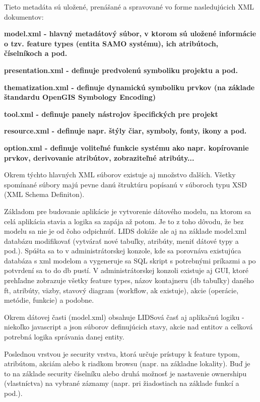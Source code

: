 Tieto metadáta sú uložené, prenášané a spravované vo forme nasledujúcich XML dokumentov:

\startitemize
\item{\start \bf model.xml \stop - hlavný metadátový súbor, v ktorom sú uložené informácie o tzv. feature types (entita SAMO systému), ich atribútoch, číselníkoch a pod.}
\item{\start \bf presentation.xml \stop - definuje predvolenú symboliku projektu a pod.}
\item{\start \bf thematization.xml \stop - definuje dynamickú symboliku prvkov (na základe štandardu OpenGIS Symbology Encoding)}
\item{\start \bf tool.xml \stop - definuje panely nástrojov špecifických pre projekt}
\item{\start \bf resource.xml \stop - definuje napr. štýly čiar, symboly, fonty, ikony a pod.}
\item{\start \bf option.xml \stop - definuje voliteľné funkcie systému ako napr. kopírovanie prvkov, derivovanie atribútov, zobraziteľné atribúty...}
\stopitemize 

Okrem týchto hlavných XML súborov existuje aj množstvo ďalších. Všetky spomínané súbory majú pevne danú štruktúru popísanú v súboroch typu XSD (XML Schema Definiton). 

Základom pre budovanie aplikácie je vytvorenie dátového modelu, na ktorom sa celá aplikácia stavia a logika sa zapája až potom. Je to z toho dôvodu, že bez modelu sa nie je od čoho odpichnúť. LIDS dokáže ale aj na základe model.xml databázu modifikovať (vytvárať nové tabuľky, atribúty, meniť dátové typy a pod.). Spúšta sa to v administrátorskej konzole, kde sa porovnáva existujúca databáza s xml modelom a vygeneruje sa SQL skript s potrebnými príkazmi a po potvrdení sa to do db pustí. V administrátorskej konzoli existuje aj GUI, ktoré prehľadne zobrazuje všetky feature types, názov kontajneru (db tabuľky) daného ft, atribúty, väzby, stavový diagram (workflow, ak existuje), akcie (operácie, metódie, funkcie) a podobne. 

Okrem dátovej časti (model.xml) obsahuje LIDSová časť aj aplikačnú logiku - niekoľko javascript a json súborov definujúcich stavy, akcie nad entitov a celková potrebná logika správania danej entity.

Poslednou vrstvou je security vrstva, ktorá určuje prístupy k feature typom, atribútom, akciám alebo k riadkom browsu (napr. na základne lokality). Buď je to na základe security číselníku alebo druhá možnosť je nastavenie ownershipu (vlastníctva) na vybrané záznamy (napr. pri žiadostiach na základe funkcí a pod.). 

